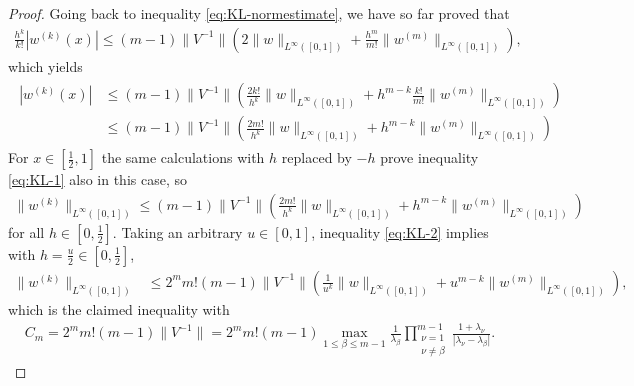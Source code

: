 \documentclass[11pt,a4paper,reqno]{amsart}
\theoremstyle{plain}
\theoremstyle{definition}
\begin{document}
\begin{proof}
	Going back to inequality \eqref{eq:KL-normestimate}, we have so far proved that
	\begin{align*}
		\frac{h^k}{k!} \left| w^{(k)}(x) \right| \leq (m-1) \|V^{-1}\| \left(2\|w\|_{L^{\infty}([0,1])} + \frac{h^m}{m!} \|w^{(m)}\|_{L^{\infty}([0,1])}\right),
	\end{align*}
	which yields
	\begin{align}\label{eq:KL-1}
	\begin{split}
		\left| w^{(k)}(x) \right| &\leq (m-1) \|V^{-1}\| \left(\frac{2 k!}{h^k} \|w\|_{L^{\infty}([0,1])} + h^{m-k} \frac{k!}{m!} \|w^{(m)}\|_{L^{\infty}([0,1])}\right) \\
		&\leq (m-1) \|V^{-1}\| \left(\frac{2 m!}{h^k} \|w\|_{L^{\infty}([0,1])} +  h^{m-k} \|w^{(m)}\|_{L^{\infty}([0,1])}\right)
		\end{split}
	\end{align}
	For $x\in[\tfrac{1}{2},1]$ the same calculations with $h$ replaced by $-h$ prove inequality \eqref{eq:KL-1} also in this case, so
	\begin{align}\label{eq:KL-2}
		\|w^{(k)}\|_{L^{\infty}([0,1])} \leq (m-1) \|V^{-1}\| \left(\frac{2 m!}{h^k} \|w\|_{L^{\infty}([0,1])} +  h^{m-k} \|w^{(m)}\|_{L^{\infty}([0,1])}\right)
	\end{align}
	for all $h\in[0, \tfrac{1}{2}]$. Taking an arbitrary $u\in[0,1]$, inequality \eqref{eq:KL-2} implies with $h=\frac{u}{2} \in [0, \tfrac{1}{2}]$,
	\begin{align*}
		\|w^{(k)}\|_{L^{\infty}([0,1])} &\leq 2^m m! (m-1) \|V^{-1}\| \left(\frac{1}{u^k} \|w\|_{L^{\infty}([0,1])} +  u^{m-k} \|w^{(m)}\|_{L^{\infty}([0,1])}\right),
	\end{align*}
	which is the claimed inequality with
	\begin{align}\label{eq:KL-constant}
		C_m = 2^m m! (m-1) \|V^{-1}\| = 2^m m! (m-1)  \max_{1\leq \beta\leq m-1} \frac{1}{\lambda_{\beta}} \prod_{\substack{\nu=1 \\\nu\neq\beta}}^{m-1} \frac{1+\lambda_{\nu}}{|\lambda_{\nu} - \lambda_{\beta}|}.
	\end{align}
\end{proof}
\end{document}
